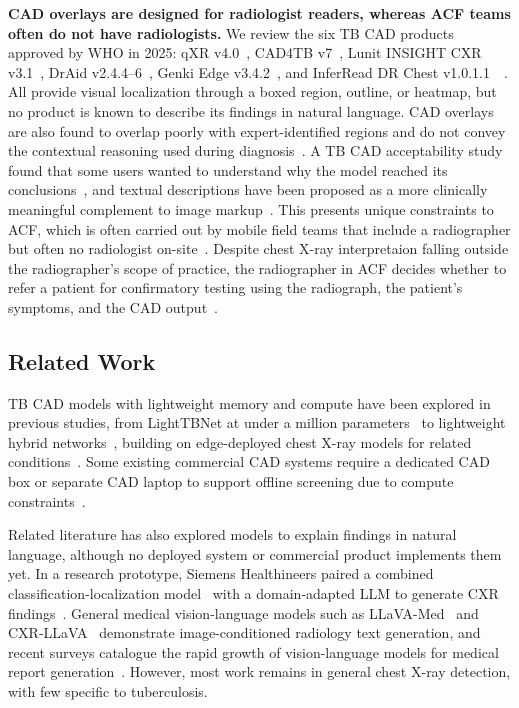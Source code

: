 \documentclass[conference, letterpaper]{IEEEtran}
\begin{document}
\textbf{CAD overlays are designed for radiologist readers, whereas ACF teams often do not have radiologists.} We review the six TB CAD products approved by WHO in 2025: qXR v4.0~\cite{qxr_docs}, CAD4TB v7~\cite{cad4tb_product}, Lunit INSIGHT CXR v3.1~\cite{lunit_product}, DrAid v2.4.4--6~\cite{draid_product}, Genki Edge v3.4.2~\cite{genki_product}, and InferRead DR Chest v1.0.1.1~\cite{inferread_product}~\cite{who_cad_approval_2025}. All provide visual localization through a boxed region, outline, or heatmap, but no product is known to describe its findings in natural language. CAD overlays are also found to overlap poorly with expert-identified regions and do not convey the contextual reasoning used during diagnosis~\cite{chen2022xai_human_centered}. A TB CAD acceptability study found that some users wanted to understand why the model reached its conclusions~\cite{hua2025qxr_acceptability}, and textual descriptions have been proposed as a more clinically meaningful complement to image markup~\cite{ihongbe2024xai_cxr, borys2023xai_beyond_saliency, siemens_llm_cxr_2023, gaube2024care_explain}. This presents unique constraints to ACF, which is often carried out by mobile field teams that include a radiographer but often no radiologist on-site~\cite{find_cad_landscape}. Despite chest X-ray interpretaion falling outside the radiographer's scope of practice, the radiographer in ACF decides whether to refer a patient for confirmatory testing using the radiograph, the patient's symptoms, and the CAD output~\cite{stoptb_cad_guide}.

\subsection{Related Work}

TB CAD models with lightweight memory and compute have been explored in previous studies, from LightTBNet at under a million parameters~\cite{capellan2023lighttbnet} to lightweight hybrid networks~\cite{owda2025hybrid_tb}, building on edge-deployed chest X-ray models for related conditions~\cite{benmalek2025edge, chauhan2024covid_edge}. Some existing commercial CAD systems require a dedicated CAD box or separate CAD laptop to support offline screening due to compute constraints~\cite{stoptb_cad_guide}.

Related literature has also explored models to explain findings in natural language, although no deployed system or commercial product implements them yet. In a research prototype, Siemens Healthineers paired a combined classification-localization model~\cite{ghesu2022ssl_medical} with a domain-adapted LLM to generate CXR findings~\cite{siemens_llm_cxr_2023}. General medical vision-language models such as LLaVA-Med~\cite{li2023llava_med} and CXR-LLaVA~\cite{lee2024cxr_llava} demonstrate image-conditioned radiology text generation, and recent surveys catalogue the rapid growth of vision-language models for medical report generation~\cite{bazi2024vlm_review}. However, most work remains in general chest X-ray detection, with few specific to tuberculosis.
\end{document}
